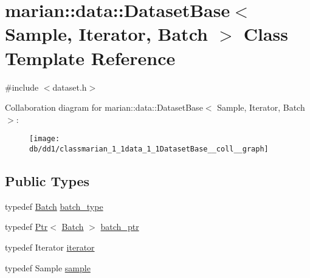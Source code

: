 \hypertarget{classmarian_1_1data_1_1DatasetBase}{}\section{marian\+:\+:data\+:\+:Dataset\+Base$<$ Sample, Iterator, Batch $>$ Class Template Reference}
\label{classmarian_1_1data_1_1DatasetBase}


{\ttfamily \#include $<$dataset.\+h$>$}



Collaboration diagram for marian\+:\+:data\+:\+:Dataset\+Base$<$ Sample, Iterator, Batch $>$\+:
\nopagebreak
\begin{figure}[H]
\begin{center}
\leavevmode
\texttt{[image: db/dd1/classmarian\_1\_1data\_1\_1DatasetBase\_\_coll\_\_graph]}
\end{center}
\end{figure}
\subsection*{Public Types}
\begin{DoxyCompactItemize}
\item 
typedef \hyperlink{classmarian_1_1data_1_1Batch}{Batch} \hyperlink{classmarian_1_1data_1_1DatasetBase_a8dd8e5fa405155eb3207e5aaa4fbdc0f}{batch\+\_\+type}
\item 
typedef \hyperlink{namespacemarian_ad1a373be43a00ef9ce35666145137b08}{Ptr}$<$ \hyperlink{classmarian_1_1data_1_1Batch}{Batch} $>$ \hyperlink{classmarian_1_1data_1_1DatasetBase_a4cb5e9051a072fcc61ed4638862f01f5}{batch\+\_\+ptr}
\item 
typedef Iterator \hyperlink{classmarian_1_1data_1_1DatasetBase_a5ab99390e2f5f8c7eab612977ae64f38}{iterator}
\item 
typedef Sample \hyperlink{classmarian_1_1data_1_1DatasetBase_afc6678b770b6da1edabe3ed6d29b4bdd}{sample}
\end{DoxyCompactItemize}
